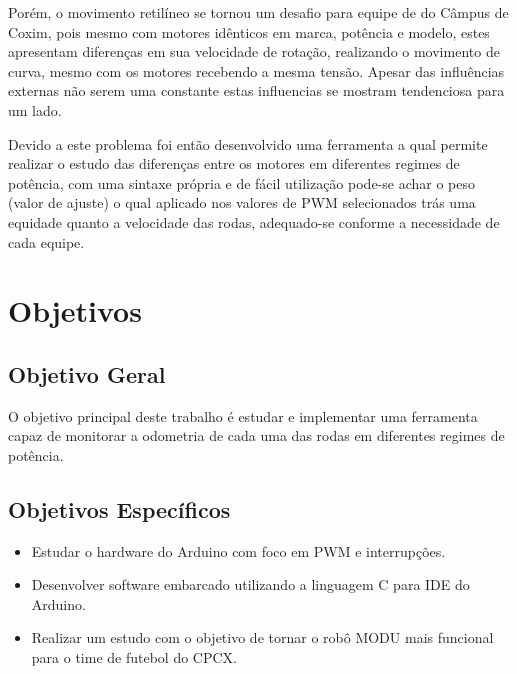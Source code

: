 \documentclass[a4paper,12pt,portuguese]{ufms-cpcx}
\begin{document}
Porém, o movimento retilíneo se tornou um desafio para equipe de do Câmpus de Coxim, pois mesmo com motores idênticos em marca, potência e modelo, estes apresentam diferenças em sua velocidade de rotação, realizando o movimento de curva, mesmo com os motores recebendo a mesma tensão. Apesar das influências externas não serem uma constante estas influencias se mostram tendenciosa para um lado.


 Devido a este problema foi então desenvolvido uma ferramenta a qual permite realizar o estudo das diferenças entre os motores em diferentes regimes de potência, com uma sintaxe própria e de fácil utilização pode-se achar o peso (valor de ajuste) o qual aplicado nos valores de PWM selecionados trás uma equidade quanto a velocidade das rodas, adequado-se conforme a necessidade de cada equipe.

 \section{Objetivos}
 
 
 \subsection*{Objetivo Geral} 
  
 O objetivo principal deste trabalho é estudar e implementar uma ferramenta capaz de monitorar a odometria de cada uma das rodas em diferentes regimes de potência. 

\subsection*{Objetivos Específicos}

\begin{itemize}
	
	\item Estudar o hardware do Arduino com foco em PWM e interrupções.
	\item Desenvolver software embarcado utilizando a linguagem C para IDE do Arduino.
	\item Realizar um estudo com o objetivo de tornar o robô MODU mais funcional para o time de futebol do CPCX.
	
\end{itemize}
\end{document}
